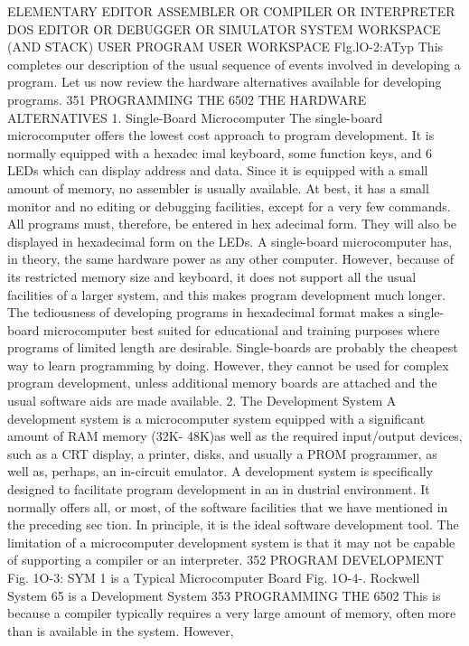 {{{{{{{{{{{{{{{{{{{{{{{{{{{{{{{{{{{{{{{{{{{{{{{{{{{{{{{{{{{{{{{{{{{{{{{{{{{{{{{{{{{{{{{{{{{{{{{{{{{{{{{{{{{{{{{{{{{{{{{{{{{{{{{{{{{{{{{{{{{{ELEMENTARY
EDITOR
ASSEMBLER
OR
COMPILER
OR
INTERPRETER
DOS
EDITOR
OR
DEBUGGER
OR
SIMULATOR
SYSTEM
WORKSPACE
(AND STACK)
USER
PROGRAM
USER
WORKSPACE
Flg.lO-2:ATyp
This completes our description of the usual sequence of
events involved in developing a program. Let us now review the
hardware alternatives available for developing programs.
351
PROGRAMMING THE 6502
THE HARDWARE ALTERNATIVES
1. Single-Board Microcomputer
The single-board microcomputer offers the lowest cost approach
to program development. It is normally equipped with a hexadec
imal keyboard, some function keys, and 6 LEDs which can display
address and data. Since it is equipped with a small amount of
memory, no assembler is usually available. At best, it has a small
monitor and no editing or debugging facilities, except for a very
few commands. All programs must, therefore, be entered in hex
adecimal form. They will also be displayed in hexadecimal form on
the LEDs. A single-board microcomputer has, in theory, the
same hardware power as any other computer. However, because
of its restricted memory size and keyboard, it does not support all
the usual facilities of a larger system, and this makes program
development much longer. The tediousness of developing programs
in hexadecimal format makes a single-board microcomputer
best suited for educational and training purposes where programs
of limited length are desirable. Single-boards are probably the
cheapest way to learn programming by doing. However, they
cannot be used for complex program development, unless additional
memory boards are attached and the usual software aids are made
available.
2. The Development System
A development system is a microcomputer system equipped
with a significant amount of RAM memory (32K- 48K)as well as
the required input/output devices, such as a CRT display, a
printer, disks, and usually a PROM programmer, as well as,
perhaps, an in-circuit emulator. A development system is
specifically designed to facilitate program development in an in
dustrial environment. It normally offers all, or most, of the
software facilities that we have mentioned in the preceding sec
tion. In principle, it is the ideal software development tool.
The limitation of a microcomputer development system is that
it may not be capable of supporting a compiler or an interpreter.
352
PROGRAM DEVELOPMENT
Fig. 1O-3: SYM 1 is a Typical Microcomputer Board
Fig. 1O-4-. Rockwell System 65 is a Development System
353
PROGRAMMING THE 6502
This is because a compiler typically requires a very large amount
of memory, often more than is available in the system. However,
}}}}}}}}}}}}}}}}}}}}}}}}}}}}}}}}}}}}}}}}}}}}}}}}}}}}}}}}}}}}}}}}}}}}}}}}}}}}}}}}}}}}}}}}}}}}}}}}}}}}}}}}}}}}}}}}}}}}}}}}}}}}}}}}}}}}}}}}}}}}
